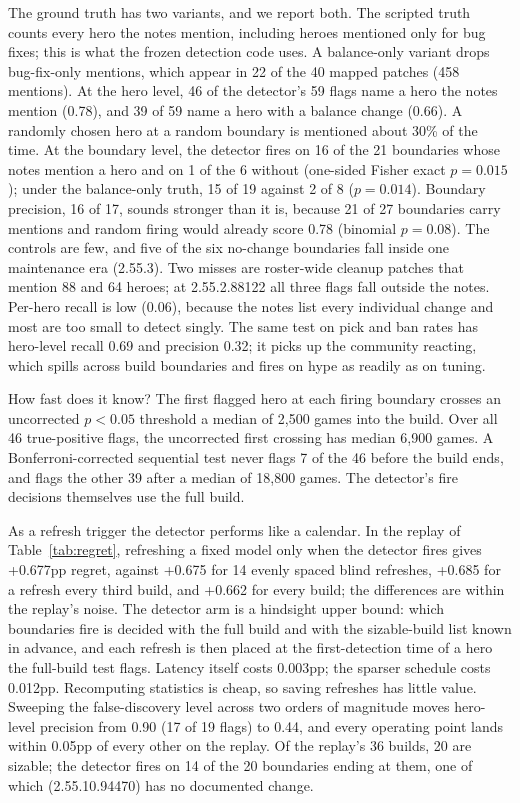 \documentclass[journal]{IEEEtran}
\begin{document}
The ground truth has two variants, and we report both. The scripted
truth counts every hero the notes mention, including heroes mentioned
only for bug fixes; this is what the frozen detection code uses. A
balance-only variant drops bug-fix-only mentions, which appear in 22 of
the 40 mapped patches (458 mentions). At the hero level, 46 of the detector's 59
flags name a hero the notes mention (0.78), and 39 of 59 name a hero with
a balance change (0.66). A randomly chosen hero at a random boundary is
mentioned about 30\% of the time. At the boundary level, the detector
fires on 16 of the 21 boundaries whose notes mention a hero and on 1 of
the 6 without (one-sided Fisher exact $p = 0.015$); under the
balance-only truth, 15 of 19 against 2 of 8 ($p = 0.014$). Boundary
precision, 16 of 17, sounds stronger than it is, because 21 of 27
boundaries carry mentions and random firing would already score 0.78
(binomial $p = 0.08$). The controls are few, and five of the six
no-change boundaries fall inside one maintenance era (2.55.3).
Two misses are roster-wide cleanup patches that mention 88 and 64 heroes;
at 2.55.2.88122 all three flags fall outside the notes. Per-hero recall
is low (0.06), because the notes list every individual change and most
are too small to detect singly. The same test on pick and ban rates has
hero-level recall 0.69 and precision 0.32; it picks up the community
reacting, which spills across build boundaries and fires on hype as
readily as on tuning.

How fast does it know? The first flagged hero at each firing boundary
crosses an uncorrected $p < 0.05$ threshold a median of 2{,}500 games
into the build. Over all 46 true-positive flags, the uncorrected first
crossing has median 6{,}900 games. A Bonferroni-corrected sequential
test never flags 7 of the 46 before the build ends, and flags the other
39 after a median of 18{,}800 games. The detector's fire decisions themselves use the
full build.

As a refresh trigger the detector performs like a calendar. In the
replay of Table~\ref{tab:regret}, refreshing a fixed model only when the
detector fires gives +0.677pp regret, against +0.675 for 14 evenly
spaced blind refreshes, +0.685 for a refresh every third build, and
+0.662 for every build; the differences are within the replay's noise.
The detector arm is a hindsight upper
bound: which boundaries fire is decided with the full build and with the
sizable-build list known in advance, and each refresh is then placed at
the first-detection time of a hero the full-build test flags. Latency
itself costs 0.003pp; the sparser schedule costs 0.012pp.
Recomputing statistics is cheap, so saving refreshes has little value.
Sweeping the false-discovery level across two orders of magnitude moves
hero-level precision from 0.90 (17 of 19 flags) to 0.44, and every
operating point lands within 0.05pp of every other on the replay. Of the
replay's 36 builds, 20 are sizable; the detector fires on 14 of the 20
boundaries ending at them, one of which (2.55.10.94470) has no
documented change.
\end{document}
